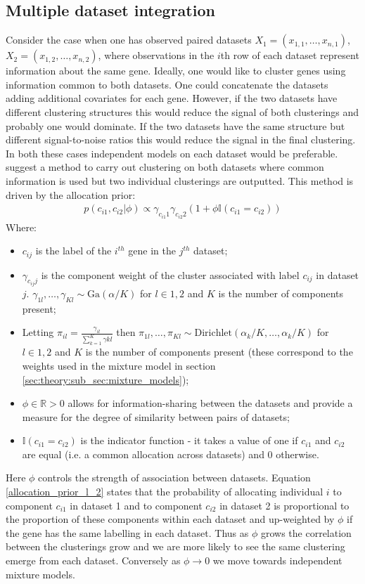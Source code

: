 \documentclass[12pt]{article} %
\begin{document}
	\subsection{Multiple dataset integration}
	Consider the case when one has observed paired datasets $X_1 = (x_{1,1},\ldots,x_{n,1})$, $X_2 = (x_{1,2},\ldots,x_{n,2})$, where observations in the $i$th row of each dataset represent information about the same gene. Ideally, one would like to cluster genes using information common to both datasets. One could concatenate the datasets adding additional covariates for each gene. However, if the two datasets have different clustering structures this would reduce the signal of both clusterings and probably one would dominate. If the two datasets have the same structure but different signal-to-noise ratios this would reduce the signal in the final clustering. In both these cases independent models on each dataset would be preferable. \citet{KirkBayesiancorrelatedclustering2012} suggest a method to carry out clustering on both datasets where common information is used but two individual clusterings are outputted. This method is driven by the allocation prior:
	\begin{align} \label{allocation_prior_l_2}
	p(c_{i1}, c_{i2} | \phi ) \propto \gamma_{c_{i1}1} \gamma_{c_{i2}2} (1 + \phi \mathbb{I}(c_{i1} = c_{i2}))
	\end{align}
	Where:
	\begin{itemize}
		\item $c_{ij}$ is the label of the $i^{th}$ gene in the $j^{th}$ dataset;
		\item $\gamma_{c_{ij}j}$ is the component weight of the cluster associated with label $c_{ij}$ in dataset $j$. $\gamma_{1l},\ldots,\gamma_{Kl} \sim \text{Ga}(\alpha / K)$ for $l \in {1,2}$ and $K$ is the number of components present;
		\item Letting $\pi_{il} = \frac{\gamma_{il}}{\sum_{k=1}^K \gamma{kl}}$ then $\pi_{1l},\ldots,\pi_{Kl} \sim \text{Dirichlet}(\alpha_k / K, \ldots, \alpha_k / K)$ for $l \in {1,2}$ and $K$ is the number of components present (these correspond to the weights used in the mixture model in section \ref{sec:theory:sub_sec:mixture_models});
		\item $\phi \in \mathbb{R} > 0$  allows for information-sharing between the datasets and provide  a  measure for the degree of similarity between pairs of datasets;
		\item $\mathbb{I}(c_{i1} = c_{i2})$ is the indicator function - it takes a value of one if $c_{i1}$ and $c_{i2}$ are equal (i.e. a common allocation across datasets) and 0 otherwise.
	\end{itemize}
	Here $\phi$ controls the strength of association between datasets. Equation \eqref{allocation_prior_l_2} states that the probability of allocating individual $i$ to component $c_{i1}$ in dataset 1 and to component $c_{i2}$ in dataset 2 is proportional to the proportion of these components within each dataset and up-weighted by $\phi$ if the gene has the same labelling in each dataset. Thus as $\phi$ grows the correlation between the clusterings grow and we are more likely to see the same clustering emerge from each dataset. Conversely as $\phi \to 0$ we move towards independent mixture models. 
	
\end{document}
